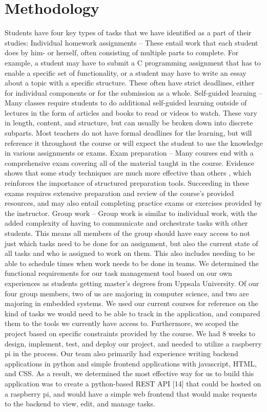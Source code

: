 \documentclass[11pt]{report}
\begin{document}
\chapter{Methodology}
Students have four key types of tasks that we have identified as a part of their studies: 
Individual homework assignments – These entail work that each student does by him- or herself, often consisting of multiple parts to complete. For example, a student may have to submit a C programming assignment that has to enable a specific set of functionality, or a student may have to write an essay about a topic with a specific structure. These often have strict deadlines, either for individual components or for the submission as a whole.
Self-guided learning – Many classes require students to do additional self-guided learning outside of lectures in the form of articles and books to read or videos to watch. These vary in length, content, and structure, but can usually be broken down into discrete subparts. Most teachers do not have formal deadlines for the learning, but will reference it throughout the course or will expect the student to use the knowledge in various assignments or exams.
Exam preparation – Many courses end with a comprehensive exam covering all of the material taught in the course. Evidence shows that some study techniques are much more effective than others \citep{dunlosky2013improving}, which reinforces the importance of structured preparation tools. Succeeding in these exams requires extensive preparation and review of the course’s provided resources, and may also entail completing practice exams or exercises provided by the instructor.
Group work – Group work is similar to individual work, with the added complexity of having to communicate and orchestrate tasks with other students. This means all members of the group should have easy access to not just which tasks need to be done for an assignment, but also the current state of all tasks and who is assigned to work on them. This also includes needing to be able to schedule times when work needs to be done in teams.
We determined the functional requirements for our task management tool based on our own experiences as students getting master’s degrees from Uppsala University. Of our four group members, two of us are majoring in computer science, and two are majoring in embedded systems. We used our current courses for reference on the kind of tasks we would need to be able to track in the application, and compared them to the tools we currently have access to. Furthermore, we scoped the project based on specific constraints provided by the course. We had 8 weeks to design, implement, test, and deploy our project, and needed to utilize a raspberry pi in the process. Our team also primarily had experience writing backend applications in python and simple frontend applications with javascript, HTML, and CSS. As a result, we determined the most effective way for us to build this application was to create a python-based REST API [14] that could be hosted on a raspberry pi, and would have a simple web frontend that would make requests to the backend to view, edit, and manage tasks.
\end{document}

